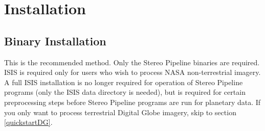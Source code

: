 \chapter{Installation}

\section{Binary Installation}

This is the recommended method. Only the Stereo Pipeline binaries
are required. ISIS is required only for users who wish to process
NASA non-terrestrial imagery.  A full ISIS installation is no longer
required for operation of Stereo Pipeline programs (only the ISIS
data directory is needed), but is required for certain preprocessing
steps before Stereo Pipeline programs are run for planetary data.
If you only want to process terrestrial Digital Globe imagery, skip
to section \ref{quickstartDG}.


